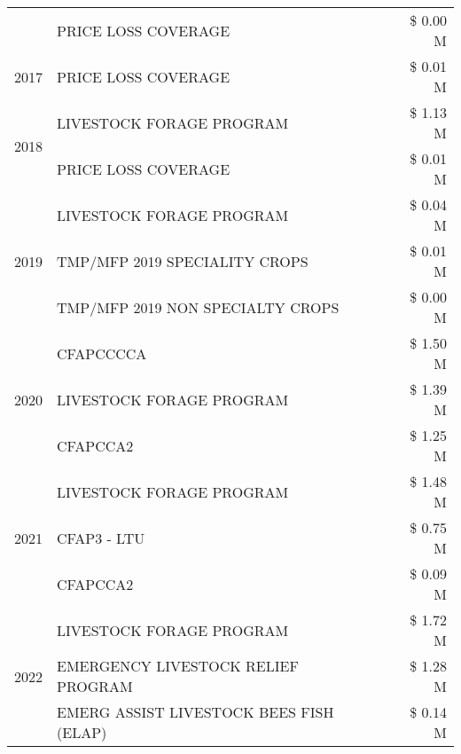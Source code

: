 \begin{tabular}{llr}
 & PRICE LOSS COVERAGE & \$ 0.00 M \\
\cline{1-3}
2017 & PRICE LOSS COVERAGE & \$ 0.01 M \\
\cline{1-3}
\multirow[t]{2}{*}{2018} & LIVESTOCK FORAGE PROGRAM & \$ 1.13 M \\
 & PRICE LOSS COVERAGE & \$ 0.01 M \\
\cline{1-3}
\multirow[t]{3}{*}{2019} & LIVESTOCK FORAGE PROGRAM & \$ 0.04 M \\
 & TMP/MFP 2019 SPECIALITY CROPS & \$ 0.01 M \\
 & TMP/MFP 2019 NON SPECIALTY CROPS & \$ 0.00 M \\
\cline{1-3}
\multirow[t]{3}{*}{2020} & CFAPCCCCA & \$ 1.50 M \\
 & LIVESTOCK FORAGE PROGRAM & \$ 1.39 M \\
 & CFAPCCA2 & \$ 1.25 M \\
\cline{1-3}
\multirow[t]{3}{*}{2021} & LIVESTOCK FORAGE PROGRAM & \$ 1.48 M \\
 & CFAP3 - LTU & \$ 0.75 M \\
 & CFAPCCA2 & \$ 0.09 M \\
\cline{1-3}
\multirow[t]{3}{*}{2022} & LIVESTOCK FORAGE PROGRAM & \$ 1.72 M \\
 & EMERGENCY LIVESTOCK RELIEF PROGRAM & \$ 1.28 M \\
 & EMERG ASSIST LIVESTOCK BEES FISH (ELAP) & \$ 0.14 M \\
\cline{1-3}
\bottomrule
\end{tabular}
